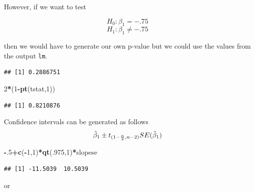 \documentclass[]{book}
\newenvironment{Shaded}{\begin{snugshade}}{\end{snugshade}}
\newcommand{\KeywordTok}[1]{\textcolor[rgb]{0.13,0.29,0.53}{\textbf{#1}}}
\newcommand{\DecValTok}[1]{\textcolor[rgb]{0.00,0.00,0.81}{#1}}
\newcommand{\StringTok}[1]{\textcolor[rgb]{0.31,0.60,0.02}{#1}}
\newcommand{\OperatorTok}[1]{\textcolor[rgb]{0.81,0.36,0.00}{\textbf{#1}}}
\newcommand{\NormalTok}[1]{#1}
\theoremstyle{definition}
\theoremstyle{definition}
\theoremstyle{definition}
\theoremstyle{remark}
\begin{document}
However, if we want to test

\[H_{0}:\beta_{1}=-.75\] \[H_{1}:\beta_{1}\neq -.75\]

then we would have to generate our own p-value but we could use the
values from the output \texttt{lm}.

\begin{Shaded}
\end{Shaded}

\begin{verbatim}
## [1] 0.2886751
\end{verbatim}

\begin{Shaded}
\begin{Highlighting}[]
\DecValTok{2}\OperatorTok{*}\NormalTok{(}\DecValTok{1}\OperatorTok{-}\KeywordTok{pt}\NormalTok{(tstat,}\DecValTok{1}\NormalTok{))}
\end{Highlighting}
\end{Shaded}

\begin{verbatim}
## [1] 0.8210876
\end{verbatim}

Confidence intervals can be generated as follows
\[\hat{\beta}_{1} \pm t_{(1-{\alpha \over 2},n-2)} SE(\hat{\beta}_{1})\]

\begin{Shaded}
\begin{Highlighting}[]
\OperatorTok{-}\NormalTok{.}\DecValTok{5}\OperatorTok{+}\KeywordTok{c}\NormalTok{(}\OperatorTok{-}\DecValTok{1}\NormalTok{,}\DecValTok{1}\NormalTok{)}\OperatorTok{*}\KeywordTok{qt}\NormalTok{(.}\DecValTok{975}\NormalTok{,}\DecValTok{1}\NormalTok{)}\OperatorTok{*}\NormalTok{slopese}
\end{Highlighting}
\end{Shaded}

\begin{verbatim}
## [1] -11.5039  10.5039
\end{verbatim}

or
\end{document}

